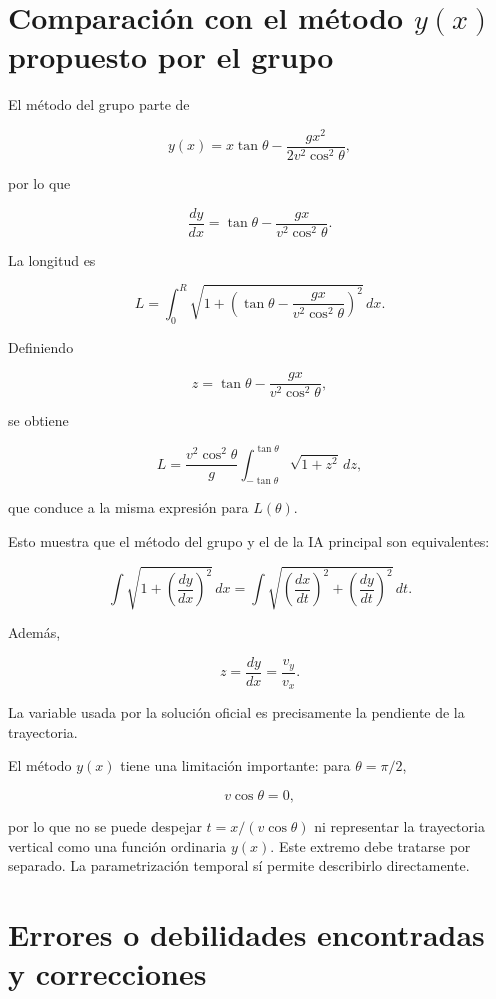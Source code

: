 \section{Comparación con el método \(y(x)\) propuesto por el grupo}

El método del grupo parte de

\[
y(x)
=
x\tan\theta
-
\frac{gx^2}{2v^2\cos^2\theta},
\]

por lo que

\[
\frac{dy}{dx}
=
\tan\theta
-
\frac{gx}{v^2\cos^2\theta}.
\]

La longitud es

\[
L
=
\int_0^R
\sqrt{
1+
\left(
\tan\theta
-
\frac{gx}{v^2\cos^2\theta}
\right)^2
}\,dx.
\]

Definiendo

\[
z=
\tan\theta
-
\frac{gx}{v^2\cos^2\theta},
\]

se obtiene

\[
L
=
\frac{v^2\cos^2\theta}{g}
\int_{-\tan\theta}^{\tan\theta}
\sqrt{1+z^2}\,dz,
\]

que conduce a la misma expresión para \(L(\theta)\).

Esto muestra que el método del grupo y el de la IA principal son equivalentes:

\[
\int
\sqrt{1+\left(\frac{dy}{dx}\right)^2}\,dx
=
\int
\sqrt{
\left(\frac{dx}{dt}\right)^2+
\left(\frac{dy}{dt}\right)^2
}\,dt.
\]

Además,

\[
z=\frac{dy}{dx}
=
\frac{v_y}{v_x}.
\]

La variable usada por la solución oficial es precisamente la pendiente de la trayectoria.

El método \(y(x)\) tiene una limitación importante: para \(\theta=\pi/2\),

\[
v\cos\theta=0,
\]

por lo que no se puede despejar \(t=x/(v\cos\theta)\) ni representar la trayectoria vertical como una función ordinaria \(y(x)\). Este extremo debe tratarse por separado. La parametrización temporal sí permite describirlo directamente.

\section{Errores o debilidades encontradas y correcciones}

